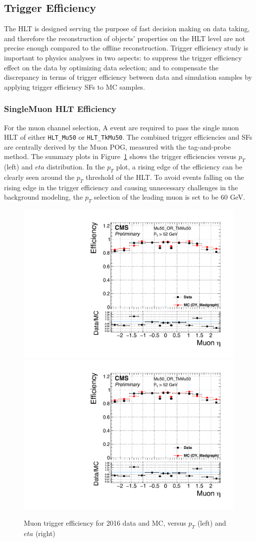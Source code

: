\subsection{Trigger Efficiency}\label{sec:bkg_trig}
The HLT is designed serving the purpose of fast decision making on data taking, and therefore the reconstruction of objects' properties on the HLT level are not precise enough compared to the offline reconstruction. Trigger efficiency study is important to physics analyses in two aspects: to suppress the trigger efficiency effect on the data by optimizing data selection; and to compensate the discrepancy in terms of trigger efficiency between data and simulation samples by applying trigger efficiency SFs to MC samples.
\subsubsection{SingleMuon HLT Efficiency}
For the muon channel selection, A event are required to pass the single muon HLT of either \texttt{HLT\_Mu50} or \texttt{HLT\_TkMu50}. The combined trigger efficiencies and SFs are centrally derived by the Muon POG, measured with the tag-and-probe method. The summary plots in Figure~\ref{fig:bg_trgeff_mu} shows the trigger efficiencies versus $p_T$ (left) and $eta$ distribution. In the $p_T$ plot, a rising edge of the efficiency can be clearly seen around the $p_T$ threshold of the HLT. To avoid events falling on the rising edge in the trigger efficiency and causing unnecessary challenges in the background modeling, the $p_T$ selection of the leading muon is set to be 60 GeV.

\begin{figure}[htpb]
\begin{center}
\includegraphics[width=0.49\linewidth, page=1]{figures/bg_muontrgeff.pdf}
\includegraphics[width=0.49\linewidth, page=2]{figures/bg_muontrgeff.pdf}
\caption{Muon trigger efficiency for 2016 data and MC, versus $p_T$ (left) and $eta$ (right)}
\label{fig:bg_trgeff_mu}
\end{center}
\end{figure}

